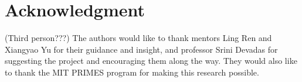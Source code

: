 \documentclass[conference]{IEEEtran}
\begin{document}


\section*{Acknowledgment}


(Third person???) The authors would like to thank mentors Ling Ren and Xiangyao Yu for their guidance and insight, and professor Srini Devadas for suggesting the project and encouraging them along the way. They would also like to thank the MIT PRIMES program for making this research possible.







%
%
%






\end{document}

